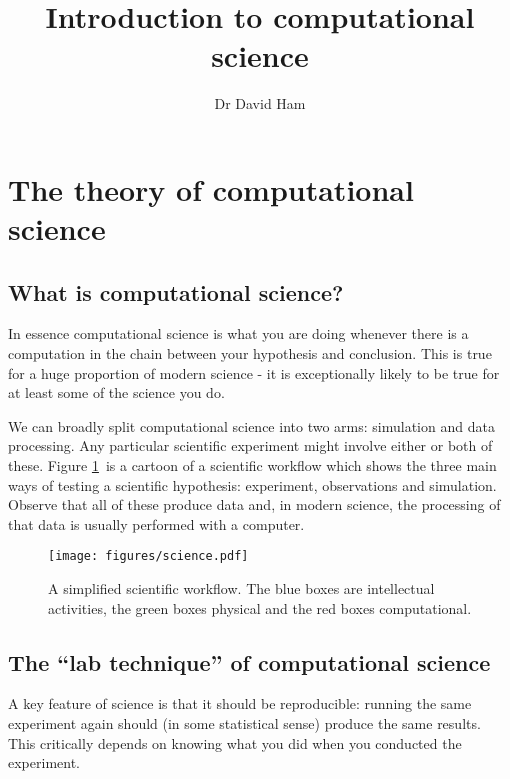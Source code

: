 \documentclass[a4paper,12pt]{article}
\theoremstyle{definition}
\begin{document}
\title{Introduction to computational science}

\author{Dr David Ham}

\renewcommand{\today}{5 November 2014}

\maketitle

\section{The theory of computational science}

\tableofcontents



\subsection{What is computational science?}

In essence computational science is what you are doing whenever there is a
computation in the chain between your hypothesis and conclusion. This is
true for a huge proportion of modern science - it is exceptionally likely to
be true for at least some of the science you do.

We can broadly split computational science into two arms: simulation and
data processing. Any particular scientific experiment might involve either
or both of these. Figure \ref{fig:science}\ is a cartoon of a scientific
workflow which shows the three main ways of testing a scientific hypothesis:
experiment, observations and simulation. Observe that all of these produce
data and, in modern science, the processing of that data is usually
performed with a computer.

\begin{figure}[ht]
  \centering
  \texttt{[image: figures/science.pdf]}
  \caption{A simplified scientific workflow. The blue boxes are intellectual activities, the green boxes physical and the red boxes computational.}
  \label{fig:science}
\end{figure}

\subsection{The ``lab technique'' of computational science}

A key feature of science is that it should be reproducible: running the
same experiment again should (in some statistical sense) produce the same
results. This critically depends on knowing what you did when you conducted
the experiment.
\end{document}
